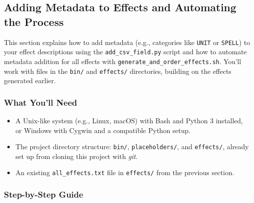 \subsection{Adding Metadata to Effects and Automating the Process}

This section explains how to add metadata (e.g., categories like \texttt{UNIT} or \texttt{SPELL}) to your effect descriptions using the \texttt{add\_csv\_field.py} script and how to automate metadata addition for all effects with \texttt{generate\_and\_order\_effects.sh}. You’ll work with files in the \texttt{bin/} and \texttt{effects/} directories, building on the effects generated earlier.

\subsubsection{What You’ll Need}
\begin{itemize}
	\item A Unix-like system (e.g., Linux, macOS) with Bash and Python 3 installed, or Windows with Cygwin and a compatible Python setup.
	\item The project directory structure: \texttt{bin/}, \texttt{placeholders/}, and \texttt{effects/}, already set up from cloning this project with \textit{git}.
	\item An existing \texttt{all\_effects.txt} file in \texttt{effects/} from the previous section.
\end{itemize}

\subsubsection{Step-by-Step Guide}

